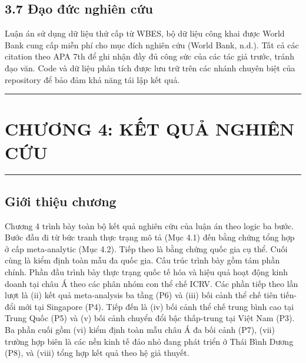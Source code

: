 \documentclass[12pt,a4paper]{article}
\begin{document}
\hypertarget{37-ux111ux1ea1o-ux111ux1ee9c-nghiuxean-cux1ee9u}{%
\subsection{3.7 Đạo đức nghiên
cứu}\label{37-ux111ux1ea1o-ux111ux1ee9c-nghiuxean-cux1ee9u}}

Luận án sử dụng dữ liệu thứ cấp từ WBES, bộ dữ liệu công khai được World
Bank cung cấp miễn phí cho mục đích nghiên cứu (World Bank, n.d.). Tất
cả các citation theo APA 7th để ghi nhận đầy đủ công sức của các tác giả
trước, tránh đạo văn. Code và dữ liệu phân tích được lưu trữ trên các
nhánh chuyên biệt của repository để bảo đảm khả năng tái lập kết quả.

\begin{center}\rule{0.5\linewidth}{0.5pt}\end{center}

\hypertarget{chux1b0ux1a1ng-4-kux1ebft-quux1ea3-nghiuxean-cux1ee9u}{%
\section{CHƯƠNG 4: KẾT QUẢ NGHIÊN
CỨU}\label{chux1b0ux1a1ng-4-kux1ebft-quux1ea3-nghiuxean-cux1ee9u}}

\begin{center}\rule{0.5\linewidth}{0.5pt}\end{center}

\hypertarget{giux1edbi-thiux1ec7u-chux1b0ux1a1ng}{%
\subsection{Giới thiệu
chương}\label{giux1edbi-thiux1ec7u-chux1b0ux1a1ng}}

Chương 4 trình bày toàn bộ kết quả nghiên cứu của luận án theo logic ba
bước. Bước đầu đi từ bức tranh thực trạng mô tả (Mục 4.1) đến bằng chứng
tổng hợp ở cấp meta-analytic (Mục 4.2). Tiếp theo là bằng chứng quốc gia
cụ thể. Cuối cùng là kiểm định toàn mẫu đa quốc gia. Cấu trúc trình bày
gồm tám phần chính. Phần đầu trình bày thực trạng quốc tế hóa và hiệu
quả hoạt động kinh doanh tại châu Á theo các phân nhóm con thể chế ICRV.
Các phần tiếp theo lần lượt là (ii) kết quả meta-analysis ba tầng (P6)
và (iii) bối cảnh thể chế tiên tiến-đổi mới tại Singapore (P4). Tiếp đến
là (iv) bối cảnh thể chế trung bình cao tại Trung Quốc (P5) và (v) bối
cảnh chuyển đổi bậc thấp-trung tại Việt Nam (P3). Ba phần cuối gồm (vi)
kiểm định toàn mẫu châu Á đa bối cảnh (P7), (vii) trường hợp biên là các
nền kinh tế đảo nhỏ đang phát triển ở Thái Bình Dương (P8), và (viii)
tổng hợp kết quả theo hệ giả thuyết.
\end{document}
